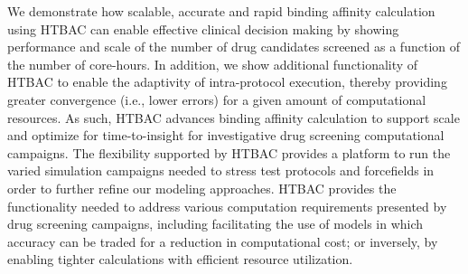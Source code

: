 \documentclass[conference]{IEEEtran}
\begin{document}




We demonstrate how scalable, accurate and rapid binding affinity calculation 
using HTBAC can enable effective clinical decision making by showing performance 
and scale of the number of drug candidates screened as a function of the 
number of core-hours. In addition, we show additional functionality of HTBAC 
to enable the adaptivity of intra-protocol execution, thereby providing greater 
convergence (i.e., lower errors) for a given amount of computational resources. 
As such, HTBAC advances binding affinity calculation to support scale and 
optimize for time-to-insight for investigative drug screening computational 
campaigns. The flexibility supported by HTBAC provides a platform to run the 
varied simulation campaigns needed to stress test protocols and forcefields in 
order to further refine our modeling approaches. HTBAC provides the 
functionality needed to address various computation requirements presented by 
drug screening campaigns, including facilitating the use of models in which  
accuracy can be traded for a reduction in computational cost; or inversely, by  
enabling tighter calculations with efficient resource utilization. 



\end{document}
